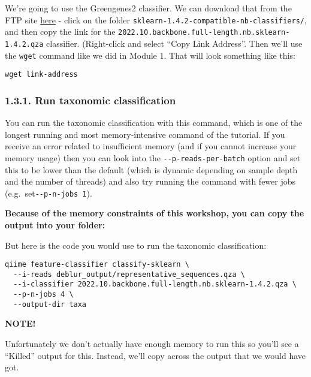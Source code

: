 \documentclass[
]{book}
\newenvironment{redbox}{
  \definecolor{shadecolor}{RGB}{243, 154, 157}
  \color{white}
  \begin{shaded}}
 {\end{shaded}}
\begin{document}
We're going to use the Greengenes2 classifier. We can download that from the FTP site \href{http://ftp.microbio.me/greengenes_release/2022.10/}{here} - click on the folder \texttt{sklearn-1.4.2-compatible-nb-classifiers/}, and then copy the link for the \texttt{2022.10.backbone.full-length.nb.sklearn-1.4.2.qza} classifier. (Right-click and select ``Copy Link Address''. Then we'll use the \texttt{wget} command like we did in Module 1. That will look something like this:

\begin{verbatim}
wget link-address
\end{verbatim}

\subsubsection{1.3.1. Run taxonomic classification}\label{run-taxonomic-classification}

You can run the taxonomic classification with this command, which is one of the longest running and most memory-intensive command of the tutorial. If you receive an error related to insufficient memory (and if you cannot increase your memory usage) then you can look into the \texttt{-\/-p-reads-per-batch} option and set this to be lower than the default (which is dynamic depending on sample depth and the number of threads) and also try running the command with fewer jobs (e.g.~set\texttt{-\/-p-n-jobs\ 1}).

\textbf{Because of the memory constraints of this workshop, you can copy the output into your folder:}

But here is the code you would use to run the taxonomic classification:

\begin{verbatim}
qiime feature-classifier classify-sklearn \
  --i-reads deblur_output/representative_sequences.qza \
  --i-classifier 2022.10.backbone.full-length.nb.sklearn-1.4.2.qza \
  --p-n-jobs 4 \
  --output-dir taxa
\end{verbatim}

\begin{redbox}

\begin{center}
\textbf{NOTE!}

\end{center}

Unfortunately we don't actually have enough memory to run this so you'll see a ``Killed'' output for this.
Instead, we'll copy across the output that we would have got.

\end{redbox}
\end{document}

